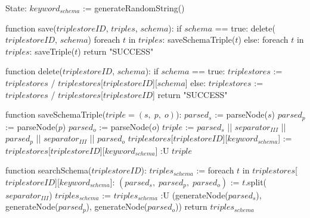 State:
    $keyword_{schema}$ := generateRandomString()

function save($triplestoreID$, $triples$, $schema$):
    if $schema$ == true:
        delete($triplestoreID$, $schema$)
        foreach $t$ in $triples$:
            saveSchemaTriple($t$)
    else:
        foreach $t$ in $triples$:
            saveTriple($t$)
    return "SUCCESS"

function delete($triplestoreID$, $schema$):
    if $schema$ == true:
        $triplestores$ := $triplestores$ / { $triplestores$[$triplestoreID$][$schema$] }
    else:
        $triplestores$ := $triplestores$ / { $triplestores$[$triplestoreID$] }
    return "SUCCESS"

function saveSchemaTriple($triple = (s, \; p, \; o)$):
    $parsed_s$ := parseNode($s$)
    $parsed_p$ := parseNode($p$)
    $parsed_o$ := parseNode($o$)
    $triple$ := $parsed_s$ || $separator_{III}$ || $parsed_p$ || $separator_{III}$ || $parsed_o$
    $triplestores$[$triplestoreID$][$keyword_{schema}$] := $triplestores$[$triplestoreID$][$keyword_{schema}$] :U { $triple$ }

function searchSchema($triplestoreID$):
    $triples_{schema}$ := {}
    foreach $t$ in $triplestores$[$triplestoreID$][$keyword_{schema}$]:
        $(parsed_s, \; parsed_p, \; parsed_o)$ := $t$.split($separator_{III}$)
        $triples_{schema}$ := $triples_{schema}$ :U { (generateNode($parsed_s$), generateNode($parsed_p$), generateNode($parsed_o$)) }
    return $triples_{schema}$